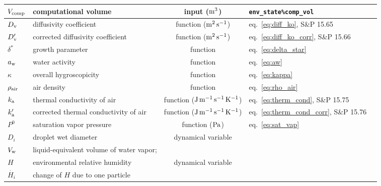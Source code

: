 \documentclass{article}
\begin{document}
\begin{tabular}{lp{4cm}clp{3cm}}
$V_{\rm comp}$ & computational volume & input ($\rm m^3$) & \verb+env_state%comp_vol+\\
\hline
$D_{\rm v}$     & diffusivity coefficient  &  function ($\rm m^2\, s^{-1}$) & eq.~\ref{eq:diff_ko}, S\&P 15.65  \\
$D_{\rm v}'$     & corrected diffusivity coefficient   &  function ($\rm m^2\, s^{-1}$) & eq.~\ref{eq:diff_ko_corr}, S\&P 15.66  \\
$\delta^*$  & growth parameter & function & eq.~\ref{eq:delta_star}\\
$a_{\rm w}$  & water activity  & function & eq.~\ref{eq:aw}   \\
$\kappa$      &  overall hygroscopicity   &  function &  eq.~\ref{eq:kappa}  \\
$\rho_{\rm air}$    &  air density   &  function &  eq.~\ref{eq:rho_air}  \\
$k_{\rm a}$     & thermal conductivity of air   &  function ($\rm J\,m^{-1}\, s^{-1} \, K^{-1}$) &  eq.~\ref{eq:therm_cond}, S\&P 15.75   \\
$k_{\rm a}'$    & corrected thermal conductivity of air   &  function ($\rm J\,m^{-1}\, s^{-1} \, K^{-1}$) &  eq.~\ref{eq:therm_cond_corr}, S\&P 15.76   \\
$P^0$   & saturation vapor pressure &  function ($\rm Pa$) & eq.~\ref{eq:sat_vap}  \\
$D_i$     &  droplet wet diameter  & dynamical variable  &     \\
$V_{\rm  w}$ & liquid-equivalent volume of water vapor; & \\
$H$     &  environmental relative humidity  &  dynamical variable &  \\
$\dot{H_i}$    & change of $H$ due to one particle & & \\
\hline 
\end{tabular}
\end{document}
